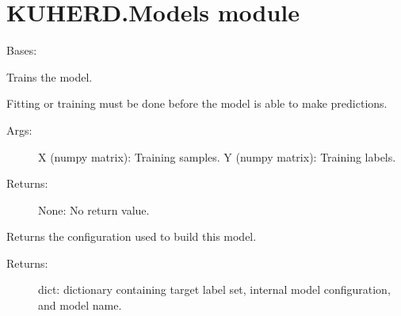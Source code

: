 \documentclass[letterpaper,10pt,english]{sphinxmanual}
\begin{document}
\section{KUHERD.Models module}
\label{\detokenize{KUHERD:kuherd-models-module}}\label{\detokenize{KUHERD:module-KUHERD.Models}}

\begin{fulllineitems}
\label{\detokenize{KUHERD:KUHERD.Models.ClassificationModel}}
Bases: 

\begin{fulllineitems}
\label{\detokenize{KUHERD:KUHERD.Models.ClassificationModel.fit}}
Trains the model.

Fitting or \sphinxquotedblleft{}training\sphinxquotedblright{} must be done before the model is able to make predictions.
\begin{description}
\item[{Args:}] \leavevmode
X (numpy matrix): Training samples.
Y (numpy matrix): Training labels.

\item[{Returns:}] \leavevmode
None: No return value.

\end{description}

\end{fulllineitems}


\begin{fulllineitems}
\label{\detokenize{KUHERD:KUHERD.Models.ClassificationModel.get_config}}
Returns the configuration used to build this model.
\begin{description}
\item[{Returns:}] \leavevmode
dict: dictionary containing target label set, internal model configuration, and model name.

\end{description}

\end{fulllineitems}



\end{fulllineitems}
\end{document}
